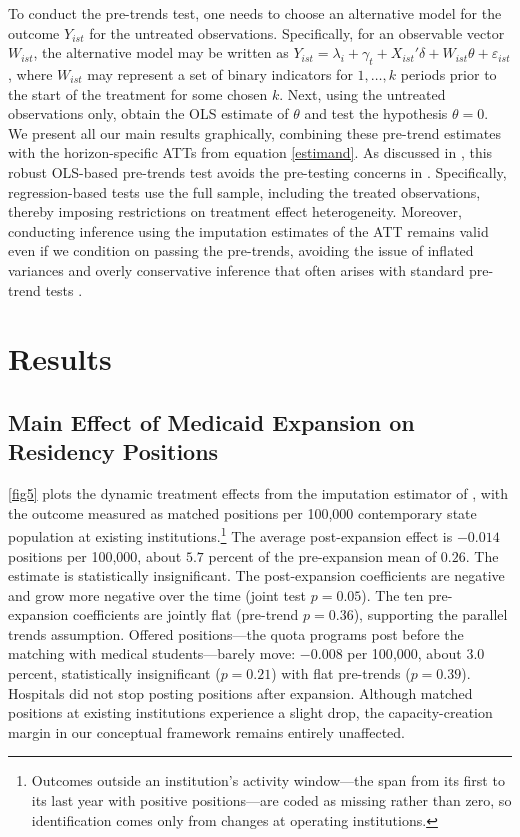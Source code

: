 To conduct the pre-trends test, one needs to choose an alternative model for the outcome $Y_{ist}$ for the untreated observations. Specifically, for an observable vector $W_{ist}$, the alternative model may be written as $Y_{ist} = \lambda_i  + \gamma_t + X_{ist}'\delta + W_{ist}\theta + \varepsilon_{ist}$, where $W_{ist}$ may represent a set of binary indicators for $1, \ldots, k$ periods prior to the start of the treatment for some chosen $k$. Next, using the untreated observations only, obtain the OLS estimate of $\theta$ and test the hypothesis $\theta = 0$. We present all our main results graphically, combining these pre-trend estimates with the horizon-specific ATTs from equation \eqref{estimand}. As discussed in \textcite{borusyak2024revisiting}, this robust OLS-based pre-trends test avoids the pre-testing concerns in \textcite{roth2022pretest}. Specifically, regression-based tests use the full sample, including the treated observations, thereby imposing restrictions on treatment effect heterogeneity. Moreover, conducting inference using the imputation estimates of the ATT remains valid even if we condition on passing the pre-trends, avoiding the issue of inflated variances and overly conservative inference that often arises with standard pre-trend tests \autocite{roth2022pretest}.


\section{Results}\label{sec:res}

\subsection{Main Effect of Medicaid Expansion on Residency Positions}\label{subsec:main}
 
\cref{fig5} plots the dynamic treatment effects from the imputation estimator of \textcite{borusyak2024revisiting}, with the outcome measured as matched positions per 100{,}000 contemporary state population at existing institutions.\footnote{Outcomes outside an institution's activity window---the span from its first to its last year with positive positions---are coded as missing rather than zero, so identification comes only from changes at operating institutions.} The average post-expansion effect is $-0.014$ positions per 100{,}000, about $5.7$ percent of the pre-expansion mean of $0.26$. The estimate is statistically insignificant. The post-expansion coefficients are negative and grow more negative over the time (joint test $p = 0.05$). The ten pre-expansion coefficients are jointly flat (pre-trend $p = 0.36$), supporting the parallel trends assumption. Offered positions---the quota programs post before the matching with medical students---barely move: $-0.008$ per 100{,}000, about $3.0$ percent, statistically insignificant ($p = 0.21$) with flat pre-trends ($p = 0.39$). Hospitals did not stop posting positions after expansion. Although matched positions at existing institutions experience a slight drop, the capacity-creation margin in our conceptual framework remains entirely unaffected.


